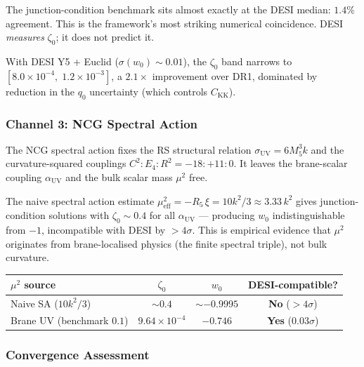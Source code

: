 \noindent
The junction-condition benchmark sits almost exactly at the DESI median: $1.4\%$ agreement. This is the framework's most striking numerical coincidence. DESI \emph{measures} $\zeta_0$; it does not predict it.

With DESI Y5 + Euclid ($\sigma(w_0) \sim 0.01$), the $\zeta_0$ band narrows to $[8.0 \times 10^{-4},\; 1.2 \times 10^{-3}]$, a $2.1\times$ improvement over DR1, dominated by reduction in the $q_0$ uncertainty (which controls $C_\mathrm{KK}$).

\subsubsection{Channel 3: NCG Spectral Action}

The NCG spectral action fixes the RS structural relation $\sigma_{\mathrm{UV}} = 6M_5^3 k$ and the curvature-squared couplings $C^2 : E_4 : R^2 = -18 : +11 : 0$. It leaves the brane-scalar coupling $\alpha_{\mathrm{UV}}$ and the bulk scalar mass $\mu^2$ free.

The naive spectral action estimate $\mu_{\mathrm{eff}}^2 = -R_5\,\xi = 10k^2/3 \approx 3.33\,k^2$ gives junction-condition solutions with $\zeta_0 \sim 0.4$ for all $\alpha_{\mathrm{UV}}$ --- producing $w_0$ indistinguishable from $-1$, incompatible with DESI by $> 4\sigma$. This is empirical evidence that $\mu^2$ originates from brane-localised physics (the finite spectral triple), not bulk curvature.

\begin{center}
\small
\begin{tabular}{l c c c}
\hline
$\mu^2$ source & $\zeta_0$ & $w_0$ & DESI-compatible? \\
\hline
Naive SA ($10k^2/3$) & $\sim 0.4$ & $\sim -0.9995$ & \textbf{No} ($>4\sigma$) \\
Brane UV (benchmark $0.1$) & $9.64 \times 10^{-4}$ & $-0.746$ & \textbf{Yes} ($0.03\sigma$) \\
\hline
\end{tabular}
\end{center}

\subsubsection{Convergence Assessment}

